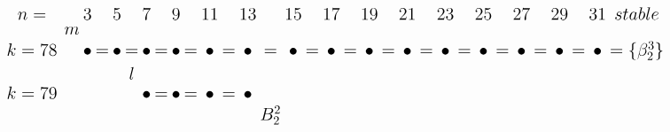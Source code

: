 \documentclass{article}
\begin{document}
\(
\begin{tikzcd}[
nodes={font=\Large,inner sep=0pt},
row sep=0.2cm,
column sep=0.1cm
]
n= && & 3 & & 5 & & 7 & & 9 & & 11 & & 13 & & 15 & & 17 && 19 && 21 && 23 && 25 && 27 && 29 && 31 & stable \\
&& m && && && && && &&  \\
k=78 &&& \bullet &=& \bullet &=& \bullet &=& \bullet &=& \bullet &=& \bullet  &=& \bullet  &=& \bullet  &=& \bullet &=& \bullet  &=& \bullet &=& \bullet &=& \bullet &=& \bullet &=& \bullet & =\{\beta_2^3\} \\
&& && && l && && &&  \\
k=79 &&& && && \bullet &=& \bullet  &=& \bullet &=& \bullet && \\
&& && && && && && && B_2^2 \\
\\
\end{tikzcd}
\)
\end{document}
